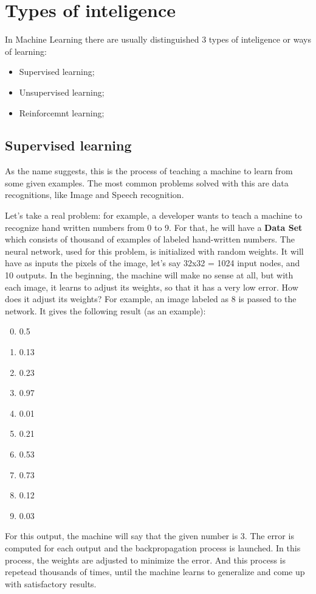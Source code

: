 \documentclass{article}
\begin{document}
	\section{Types of inteligence}
		In Machine Learning there are usually distinguished 3 types of inteligence or ways of learning:
		\begin{itemize}
			\item Supervised learning;
			\item Unsupervised learning;
			\item Reinforcemnt learning;
		\end{itemize}

		\subsection{Supervised learning}
			As the name suggests, this is the process of teaching a machine to learn from some given examples. The most common problems solved with this are data recognitions, like Image and Speech recognition.

			Let's take a real problem: for example, a developer wants to teach a machine to recognize hand written numbers from 0 to 9. For that, he will have a \textbf{Data Set} which consists of thousand of examples of labeled hand-written numbers. The neural network, used for this problem, is initialized with random weights. It will have as inputs the pixels of the image, let's say 32x32 = 1024 input nodes, and 10 outputs. In the beginning, the machine will make no sense at all, but with each image, it learns to adjust its weights, so that it has a very low error. How does it adjust its weights? For example, an image labeled as 8 is passed to the network. It gives the following result (as an example):
			\begin{enumerate}
				\setcounter{enumi}{-1}
				\item 0.5
				\item 0.13
				\item 0.23
				\item 0.97
				\item 0.01
				\item 0.21
				\item 0.53
				\item 0.73
				\item 0.12
				\item 0.03
			\end{enumerate}
			For this output, the machine will say that the given number is 3. The error is computed for each output and the backpropagation process is launched. In this process, the weights are adjusted to minimize the error.
			And this process is repetead thousands of times, until the machine learns to generalize and come up with satisfactory results.
\end{document}
